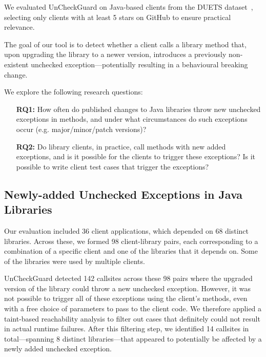 We evaluated UnCheckGuard on Java-based clients from the DUETS dataset~\cite{durieux21:_duets}, selecting only clients with at least 5 stars on GitHub to ensure practical relevance.

The goal of our tool is to detect whether a client calls a library method that, upon upgrading the library to a newer version, introduces a previously non-existent unchecked exception—potentially resulting in a behavioural breaking change.

We explore the following research questions:

\begin{itemize}
  \item[\textbf{RQ1:}] How often do published changes to Java libraries throw new unchecked exceptions in methods,
and under what circumstances do such exceptions occur (e.g. major/minor/patch versions)?
  \item[\textbf{RQ2:}]  Do library clients, in practice, call methods with new added exceptions, and is it possible for the clients to trigger these exceptions? Is it possible to write client test cases that trigger the exceptions?
\end{itemize}


\subsection{Newly-added Unchecked Exceptions in Java Libraries}

Our evaluation included 36 client applications, which depended on 68 distinct libraries. Across these, we formed 98 client-library pairs, each corresponding to a combination of a specific client and one of the libraries that it depends on. Some of the libraries were used by multiple clients.



UnCheckGuard detected 142 callsites across these 98 pairs where the upgraded version of the library could throw a new unchecked exception. However, it was not possible to trigger all of these exceptions using the client's methods, even with a free choice of parameters to pass to the client code. We therefore applied a taint-based reachability analysis to filter out cases that definitely could not result in actual runtime failures. After this filtering step, we identified 14 callsites in total—spanning 8 distinct libraries—that appeared to potentially be affected by a newly added unchecked exception. 

